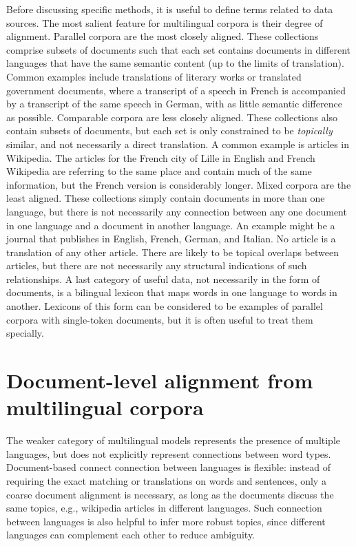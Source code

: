 Before discussing specific methods, it is useful to define terms related to data sources.
The most salient feature for multilingual corpora is their degree of alignment.
Parallel corpora are the most closely aligned. These collections comprise subsets of documents such that each set contains documents in different languages that have the same semantic content (up to the limits of translation).
Common examples include translations of literary works or translated government documents, where a transcript of a speech in French is accompanied by a transcript of the  same speech in German, with as little semantic difference as possible.
Comparable corpora are less closely aligned. 
These collections also contain subsets of documents, but each set is only constrained to be {\em topically} similar, and not necessarily a direct translation.
A common example is articles in Wikipedia.
The articles for the French city of Lille in English and French Wikipedia are referring to the same place and contain much of the same information, but the French version is considerably longer.
Mixed corpora are the least aligned. These collections simply contain documents in more than one language, but there is not necessarily any connection between any one document in one language and a document in another language.
An example might be a journal that publishes in English, French, German, and Italian.
No article is a translation of any other article.
There are likely to be topical overlaps between articles, but there are not necessarily any structural indications of such relationships.
A last category of useful data, not necessarily in the form of documents, is a bilingual lexicon that maps words in one language to words in another.
Lexicons of this form can be considered to be examples of parallel corpora with single-token documents, but it is often useful to treat them specially.

\section{Document-level alignment from multilingual corpora}

The weaker category of multilingual models represents the presence of multiple languages, but does not explicitly represent connections between word types.
Document-based connect connection between languages is flexible: instead of requiring
the exact matching or translations on words and sentences, only a
coarse document alignment is necessary, as long as the documents
discuss the same topics, e.g., wikipedia articles in different
languages. Such connection between languages is also helpful to infer
more robust topics, since different languages can complement each
other to reduce ambiguity.

